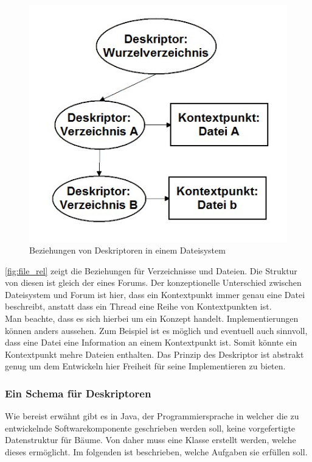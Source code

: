 \documentclass[a4paper]{article}
\begin{document}
	\begin{figure}[H]
		\centerline{
			\includegraphics[scale=0.9]{../Bilder/file_rel.jpg}
		}
		\caption{Beziehungen von Deskriptoren in einem Dateisystem}
		\label{fig:file_rel}
	\end{figure}	
	
	\autoref{fig:file_rel} zeigt die Beziehungen für Verzeichnisse und Dateien.
	Die Struktur von diesen ist gleich der eines Forums. 
	Der konzeptionelle Unterschied zwischen Dateisystem und Forum ist hier, 
	dass ein Kontextpunkt immer genau eine Datei beschreibt, anstatt dass ein
	Thread eine Reihe von Kontextpunkten ist.\\
	
	Man beachte, dass es sich hierbei um ein Konzept handelt.
	Implementierungen können anders aussehen. Zum Beispiel ist es möglich und
	eventuell auch sinnvoll, dass eine Datei eine Information an einem Kontextpunkt
	ist. Somit könnte ein Kontextpunkt mehre Dateien enthalten. Das Prinzip des
	Deskriptor ist abstrakt genug um dem Entwickeln hier Freiheit für seine
	Implementieren zu bieten.
	
	\subsubsection{Ein Schema für Deskriptoren}
	
	Wie bereist erwähnt gibt es in Java, der Programmiersprache in welcher die 
	zu entwickelnde Softwarekomponente geschrieben werden soll, keine vorgefertigte
	Datenstruktur für Bäume. Von daher muss eine Klasse erstellt werden, welche
	dieses ermöglicht. Im folgenden ist beschrieben, welche Aufgaben sie erfüllen
	soll.
	
\end{document}
